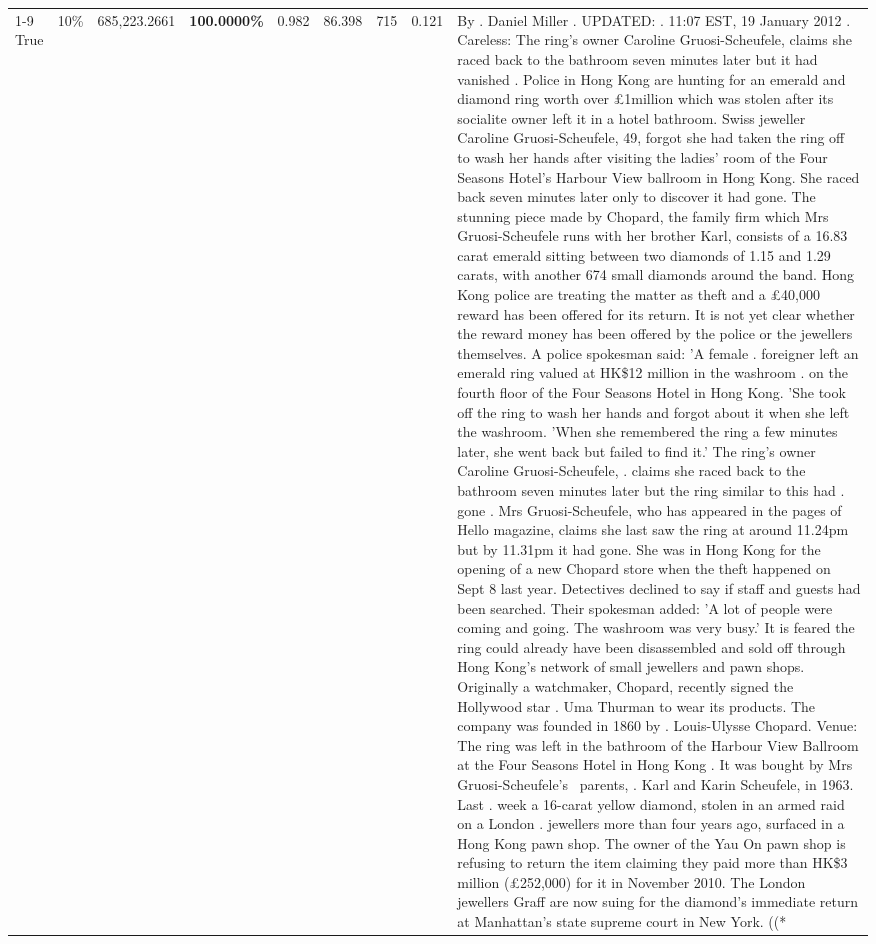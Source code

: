 \begin{table}[H]
\begin{tabular}{lllrlllll}
\cline{1-9} \cline{2-9}
True & 10\% & 685,223.2661 & \bfseries \color{red} 100.0000\% & 0.982 & 86.398 & 715 & 0.121 & By . Daniel Miller . UPDATED: . 11:07 EST, 19 January 2012 . Careless: The ring's owner Caroline Gruosi-Scheufele, claims she raced back to the bathroom seven minutes later but it had vanished . Police in Hong Kong are hunting for an emerald and diamond ring worth over £1million which was stolen after its socialite owner left it in a hotel bathroom. Swiss jeweller Caroline Gruosi-Scheufele, 49, forgot she had taken the ring off to wash her hands after visiting the ladies' room of the Four Seasons Hotel's Harbour View ballroom in Hong Kong. She raced back seven minutes later only to discover it had gone. The stunning piece made by Chopard, the family firm which Mrs Gruosi-Scheufele runs with her brother Karl, consists of a 16.83 carat emerald sitting between two diamonds of 1.15 and 1.29 carats, with another 674 small diamonds around the band. Hong Kong police are treating the matter as theft and a £40,000 reward has been offered for its return. It is not yet clear whether the reward money has been offered by the police or the jewellers themselves. A police spokesman said: 'A female . foreigner left an emerald ring valued at HK\$12 million in the washroom . on the fourth floor of the Four Seasons Hotel in Hong Kong. 'She took off the ring to wash her hands and forgot about it when she left the washroom. 'When she remembered the ring a few minutes later, she went back but failed to find it.' The ring's owner Caroline Gruosi-Scheufele, . claims she raced back to the bathroom seven minutes later but the ring similar to this had . gone . Mrs Gruosi-Scheufele, who has appeared in the pages of Hello magazine, claims she last saw the ring at around 11.24pm but by 11.31pm it had gone. She was in Hong Kong for the opening of a new Chopard store when the theft happened on Sept 8 last year. Detectives declined to say if staff and guests had been searched. Their spokesman added: 'A lot of people were coming and going. The washroom was very busy.' It is feared the ring could already have been disassembled and sold off through Hong Kong's network of small jewellers and pawn shops. Originally a watchmaker, Chopard, recently signed the Hollywood star . Uma Thurman to wear its products. The company was founded in 1860 by . Louis-Ulysse Chopard. Venue: The ring was left in the bathroom of the Harbour View Ballroom at the Four Seasons Hotel in Hong Kong . It was bought by Mrs Gruosi-Scheufele's  parents, . Karl and Karin Scheufele, in 1963. Last . week a 16-carat yellow diamond, stolen in an armed raid on a London . jewellers more than four years ago, surfaced in a Hong Kong pawn shop. The owner of the Yau On pawn shop is refusing to return the item claiming they paid more than HK\$3 million (£252,000) for it in November 2010. The London jewellers Graff are now suing for the diamond’s immediate return at Manhattan’s state supreme court in New York. ((* \\

\end{tabular}
\end{table}
